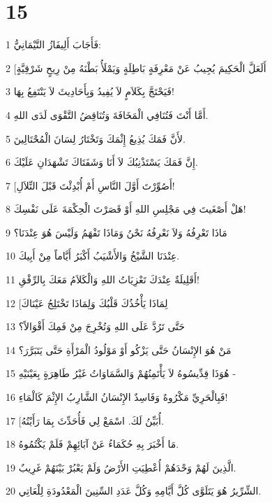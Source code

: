 \chapter{15}

\par 1 فَأَجَابَ أَلِيفَازُ التَّيْمَانِيُّ:
\par 2 [أَلَعَلَّ الْحَكِيمَ يُجِيبُ عَنْ مَعْرِفَةٍ بَاطِلَةٍ وَيَمْلَأُ بَطْنَهُ مِنْ رِيحٍ شَرْقِيَّةٍ
\par 3 فَيَحْتَجَّ بِكَلاَمٍ لاَ يُفِيدُ وَبِأَحَادِيثَ لاَ يَنْتَفِعُ بِهَا!
\par 4 أَمَّا أَنْتَ فَتُنَافِي الْمَخَافَةَ وَتُنَاقِضُ التَّقْوَى لَدَى اللهِ.
\par 5 لأَنَّ فَمَكَ يُذِيعُ إِثْمَكَ وَتَخْتَارُ لِسَانَ الْمُحْتَالِينَ.
\par 6 إِنَّ فَمَكَ يَسْتَذْنِبُكَ لاَ أَنَا وَشَفَتَاكَ تَشْهَدَانِ عَلَيْكَ.
\par 7 [أَصُوِّرْتَ أَوَّلَ النَّاسِ أَمْ أُبْدِئْتَ قَبْلَ التِّلاَلِ!
\par 8 هَلْ أَصْغَيتَ فِي مَجْلِسِ اللهِ أَوْ قَصَرْتَ الْحِكْمَةَ عَلَى نَفْسِكَ!
\par 9 مَاذَا تَعْرِفُهُ وَلاَ نَعْرِفُهُ نَحْنُ وَمَاذَا تَفْهَمُ وَلَيْسَ هُوَ عِنْدَنَا؟
\par 10 عِنْدَنَا الشَّيْخُ وَالأَشْيَبُ أَكْبَرُ أَيَّاماً مِنْ أَبِيكَ.
\par 11 أَقَلِيلَةٌ عِنْدَكَ تَعْزِيَاتُ اللهِ وَالْكَلاَمُ مَعَكَ بِالرِّفْقِ!
\par 12 [لِمَاذَا يَأْخُذُكَ قَلْبُكَ وَلِمَاذَا تَخْتَلِجُ عَيْنَاكَ
\par 13 حَتَّى تَرُدَّ عَلَى اللهِ وَتُخْرِجَ مِنْ فَمِكَ أَقْوَالاً؟
\par 14 مَنْ هُوَ الإِنْسَانُ حَتَّى يَزْكُو أَوْ مَوْلُودُ الْمَرْأَةِ حَتَّى يَتَبَرَّرَ؟
\par 15 هُوَذَا قِدِّيسُوهُ لاَ يَأْتَمِنُهُمْ وَالسَّمَاوَاتُ غَيْرُ طَاهِرَةٍ بِعَيْنَيْهِ -
\par 16 فَبِالْحَرِيِّ مَكْرُوهٌ وَفَاسِدٌ الإِنْسَانُ الشَّارِبُ الإِثْمَ كَالْمَاءِ!
\par 17 [أُبَيِّنُ لَكَ. اسْمَعْ لِي فَأُحَدِّثَ بِمَا رَأَيْتُهُ.
\par 18 مَا أَخْبَرَ بِهِ حُكَمَاءُ عَنْ آبَائِهِمْ فَلَمْ يَكْتُمُوهُ.
\par 19 الَّذِينَ لَهُمْ وَحْدَهُمْ أُعْطِيَتِ الأَرْضُ وَلَمْ يَعْبُرْ بَيْنَهُمْ غَرِيبٌ.
\par 20 الشِّرِّيرُ هُوَ يَتَلَوَّى كُلَّ أَيَّامِهِ وَكُلَّ عَدَدِ السِّنِينَ الْمَعْدُودَةِ لِلْعَاتِي.
